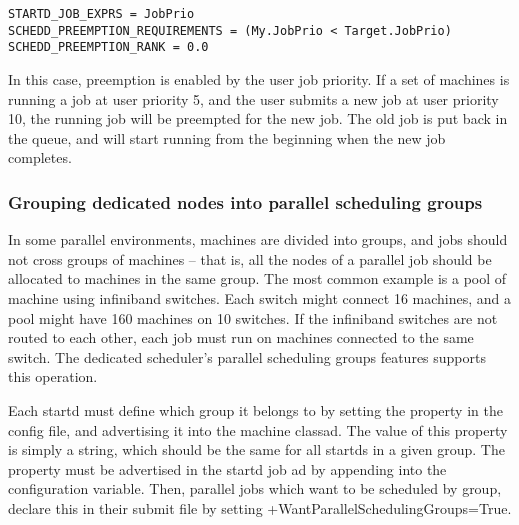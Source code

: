 \begin{verbatim}
STARTD_JOB_EXPRS = JobPrio
SCHEDD_PREEMPTION_REQUIREMENTS = (My.JobPrio < Target.JobPrio)
SCHEDD_PREEMPTION_RANK = 0.0
\end{verbatim}

In this case, preemption is enabled by the user job priority. If a set
of machines is running a job at user priority 5, and the user submits
a new job at user priority 10, the running job will be preempted for
the new job.  The old job is put back in the queue, and will start running
from the beginning when the new job completes.

\subsubsection{\label{sec:Configure-Dedicated-Groups}
Grouping dedicated nodes into parallel scheduling groups}

In some parallel environments, machines are divided into groups, and
jobs should not cross groups of machines -- that is, all the nodes of a parallel
job should be allocated to machines in the same group.  The most common
example is a pool of machine using infiniband switches.  Each switch
might connect 16 machines, and a pool might have 160 machines on 10 switches.
If the infiniband switches are not routed to each other, each job must run 
on machines connected to the same switch.  The dedicated scheduler's 
parallel scheduling groups features supports this operation.

Each startd must define which group it belongs to by setting the 
 property in the config file, and 
advertising it into the machine classad.  The value of this property is simply a
string, which should be the same for all startds in a given group.  The property
must be advertised in the startd job ad by appending 
into the  configuration variable.
Then, parallel jobs which want to be scheduled by group, declare this in their 
submit file by setting +WantParallelSchedulingGroups=True.

